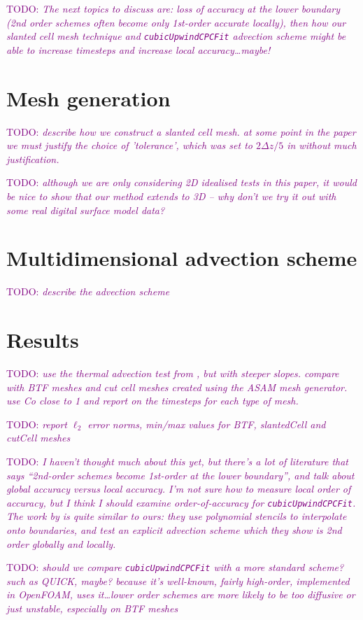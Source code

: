 \documentclass{article}
\newcommand{\TODO}[1]{\textcolor{purple}{TODO: \emph{#1}}}
\begin{document}
\vspace*{2em}


\TODO{The next topics to discuss are: loss of accuracy at the lower boundary (2nd order schemes often become only 1st-order accurate locally), then how our slanted cell mesh technique and \texttt{cubicUpwindCPCFit} advection scheme might be able to increase timesteps and increase local accuracy\ldots maybe!}

\section{Mesh generation}
\TODO{describe how we construct a slanted cell mesh.  at some point in the paper we must justify the choice of 'tolerance', which was set to $2\Delta z/5$ in \citet{shaw-weller2016} without much justification.}

\TODO{although we are only considering 2D idealised tests in this paper, it would be nice to show that our method extends to 3D -- why don't we try it out with some real digital surface model data?}

\section{Multidimensional advection scheme}
\TODO{describe the advection scheme}

\section{Results}
\TODO{use the thermal advection test from \citet{shaw-weller2016}, but with steeper slopes.  compare with BTF meshes and cut cell meshes created using the ASAM mesh generator.  use Co close to 1 and report on the timesteps for each type of mesh.}

\TODO{report $\ell_2$ error norms, min/max values for BTF, slantedCell and cutCell meshes}

\TODO{I haven't thought much about this yet, but there's a lot of literature that says ``2nd-order schemes become 1st-order at the lower boundary'', and talk about global accuracy versus local accuracy.  I'm not sure how to measure local order of accuracy, but I think I should examine order-of-accuracy for \texttt{cubicUpwindCPCFit}.  The work by \citet{ye1999} is quite similar to ours: they use polynomial stencils to interpolate onto boundaries, and test an explicit advection scheme which they show is 2nd order globally and locally.}

\TODO{should we compare \texttt{cubicUpwindCPCFit} with a more standard scheme?  such as QUICK, maybe?  because it's well-known, fairly high-order, implemented in OpenFOAM, \citet{kirkpatrick2003} uses it\ldots  lower order schemes are more likely to be too diffusive or just unstable, especially on BTF meshes}
\end{document}
